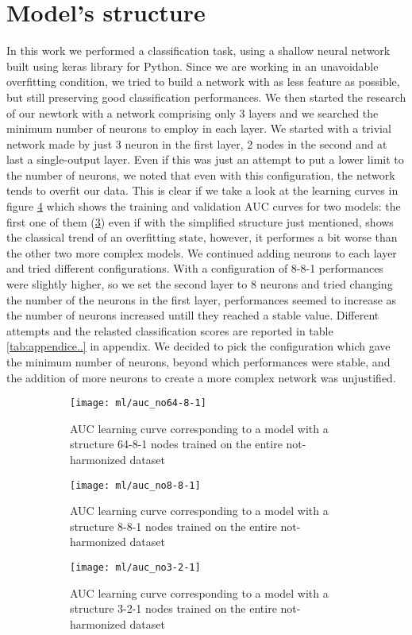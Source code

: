 \documentclass[12pt]{report}
\begin{document}
\section{Model's structure}
In this work we performed a classification task, using a shallow neural network built using keras library for Python.
Since we are working in an unavoidable overfitting condition, we tried to build a network with as less feature as possible, but still preserving good classification performances.
We then started the research of our newtork with a network comprising only 3 layers and we searched the minimum number of neurons to employ in each layer.
We started with a trivial network made by just 3 neuron in the first layer, 2 nodes in the second and at last a single-output layer. Even if this was just an attempt to put a lower limit to the number of neurons, we noted that even with this configuration, the network tends to overfit our data.
This is clear if we take a look at the learning curves in figure \ref{fig:learningcurve} which shows the training and validation AUC curves for two models: the first one of them (\ref{fig:auc_no3-2-1}) even if with the simplified structure just mentioned, shows the classical trend of an overfitting state, however, it performes a bit worse than the other two more complex models.
We continued adding neurons to each layer and tried different configurations. With a configuration of 8-8-1 performances were slightly higher, so we set the second layer to 8 neurons and tried changing the number of the neurons in the first layer, performances seemed to increase as the number of neurons increased untill they reached a stable value. Different attempts and the relasted classification scores are reported in table \ref{tab:appendice..} in appendix.
We decided to pick the configuration which gave the minimum number of neurons, beyond which performances were stable, and the addition of more neurons to create a more complex network was unjustified.

\begin{figure}
\centering
\begin{subfigure}[b]{0.3\textwidth}
   \texttt{[image: ml/auc\_no64-8-1]}
   \caption{AUC learning curve corresponding to a model with a structure 64-8-1 nodes trained on the entire not-harmonized dataset}
   \label{fig:auc_no64-8-1}
\end{subfigure}
\begin{subfigure}[b]{0.3\textwidth}
   \texttt{[image: ml/auc\_no8-8-1]}
   \caption{AUC learning curve corresponding to a model with a structure 8-8-1 nodes trained on the entire not-harmonized dataset}
   \label{fig:auc_no8-8-1}
\end{subfigure}
\begin{subfigure}[b]{0.3\textwidth}
   \texttt{[image: ml/auc\_no3-2-1]}
   \caption{AUC learning curve corresponding to a model with a structure 3-2-1 nodes trained on the entire not-harmonized dataset}
   \label{fig:auc_no3-2-1}
\end{subfigure}
\caption{}
\label{fig:learningcurve}
\end{figure}
\end{document}
